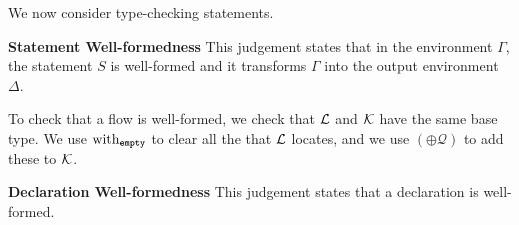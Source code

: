 \documentclass[nonacm, dvipsnames, sigconf]{acmart}
\begin{document}
We now consider type-checking statements.

 \textbf{Statement Well-formedness}
This judgement states that in the environment $\Gamma$, the statement $S$ is well-formed and it transforms $\Gamma$ into the output environment $\Delta$.

To check that a flow is well-formed, we check that $\Loc$ and $\LocK$ have the same base type.
We use $\with_{\emptyq}$ to clear all the that $\Loc$ locates, and we use $(\oplus \mathcal{Q})$ to add these to $\LocK$.
\begin{mathpar}
\end{mathpar}


\framebox{$\flowproves \Decl~\ok$} \textbf{Declaration Well-formedness}
This judgement states that a declaration is well-formed.

\end{document}
